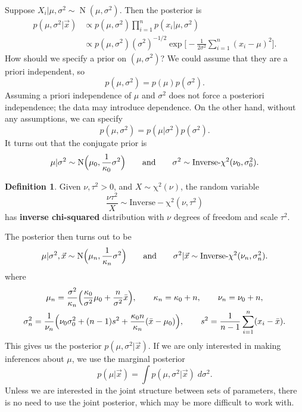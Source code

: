 \documentclass[article]{memoir}
\DeclareMathOperator{\1}{\mathbf{1}}
\newcommand{\dist}[1]{\operatorname{#1}}
\theoremstyle{definition}
\newtheorem{defi}{Definition}[chapter]
\begin{document}
Suppose $X_i \vert \mu, \sigma^2 \sim \dist{N}(\mu, \sigma^2)$. Then the
posterior is
    \begin{align*}
    p(\mu, \sigma^2 \vert \vec{x})
    &\propto
    p(\mu, \sigma^2) \prod_{i=1}^n p(x_i \vert \mu, \sigma^2)
    \\ &\propto
    p(\mu, \sigma^2) (\sigma^2)^{-1/2} 
    \exp \biggl[ -\frac{1}{2\sigma^2} \sum_{i=1}^n (x_i - \mu)^2 \biggr].
    \end{align*}
How should we specify a prior on $(\mu, \sigma^2)$? We could assume that
they are a priori independent, so
    \[
    p(\mu, \sigma^2) = p(\mu) p(\sigma^2).
    \]
Assuming a priori independence of $\mu$ and $\sigma^2$ does not force a 
posteriori independence; the data may introduce dependence. On the other
hand, without any assumptions, we can specify
    \[
    p(\mu, \sigma^2) = p(\mu \vert \sigma^2) p(\sigma^2).
    \]
It turns out that the conjugate prior is
    \[
    \mu \vert \sigma^2
    \sim
    \dist{N}\Bigl( \mu_0, \frac{1}{\kappa_0} \sigma^2 \Bigr)
    \qquad\text{and}\qquad
    \sigma^2
    \sim
    \dist{Inverse-\chi^2}(\nu_0, \sigma_0^2).
    \]
    \begin{defi} Given $\nu, \tau^2 > 0$, and $X \sim \dist{\chi^2}(\nu)$, 
    the random variable
        \[
        \frac{\nu \tau^2}{X}
        \sim
        \dist{Inverse-\chi^2}(\nu, \tau^2)
        \]
    has \textbf{inverse chi-squared} distribution with $\nu$ degrees of
    freedom and scale $\tau^2$.
    \end{defi}
The posterior then turns out to be
    \[
    \mu \vert \sigma^2, \vec{x}
    \sim
    \dist{N}\Bigl( \mu_n, \frac{1}{\kappa_n} \sigma^2 \Bigr)
    \qquad\text{and}\qquad
    \sigma^2 \vert \vec{x}
    \sim
    \dist{Inverse-\chi^2}(\nu_n, \sigma_n^2).
    \]
where
    \begin{gather*}
    \mu_n = \frac{\sigma^2}{\kappa_n}
    \Bigl( \frac{\kappa_0}{\sigma^2}\mu_0 + \frac{n}{\sigma^2}\bar{x} \Bigr),
    \qquad
    \kappa_n = \kappa_0 + n,
    \qquad
    \nu_n = \nu_0 + n,
    \\
    \sigma_n^2 = \frac{1}{\nu_n}
    \Bigl( \nu_0\sigma_0^2 + (n - 1)s^2 
    + \frac{\kappa_0 n}{\kappa_n}(\bar{x} - \mu_0) \Bigr),
    \qquad
    s^2 =
    \frac{1}{n - 1} \sum_{i=1}^n (x_i - \bar{x}).
    \end{gather*}
This gives us the posterior $p(\mu, \sigma^2 \vert \vec{x})$. If we are only
interested in making inferences about $\mu$, we use the marginal posterior
    \[
    p(\mu \vert \vec{x})
    =
    \int p(\mu, \sigma^2 \vert \vec{x}) \;d\sigma^2.
    \]
Unless we are interested in the joint structure between sets of parameters,
there is no need to use the joint posterior, which may be more difficult to
work with.
\end{document}
